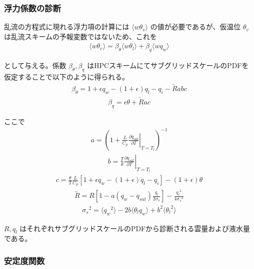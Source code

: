 \hypertarget{ux6d6eux529bux4fc2ux6570ux306eux8a3aux65ad}{%
\subsubsection{浮力係数の診断}\label{ux6d6eux529bux4fc2ux6570ux306eux8a3aux65ad}}

乱流の方程式に現れる浮力項の計算には \(\langle w\theta_v \rangle\)
の値が必要であるが、仮温位 \(\theta_v\)
は乱流スキームの予報変数ではないため、これを
\begin{eqnarray}\langle w\theta_v \rangle=\beta_\theta \langle w\theta_l \rangle + \beta_q \langle wq_w \rangle\end{eqnarray}

として与える。係数 \(\beta_\theta , \beta_q\)
はHPCスキームにてサブグリッドスケールのPDFを仮定することで以下のように得られる。
\begin{eqnarray}\beta_\theta=1+\epsilon q_w-(1+\epsilon)q_l-q_i-\tilde{R}abc\end{eqnarray}
\begin{eqnarray}\beta_q=\epsilon \theta +\tilde{R}ac\end{eqnarray}

ここで
\begin{eqnarray}a=\left(1+\frac{L}{C_p}\left.\frac{\partial q_{sat}}{\partial T}\right|_{T=T_l}\right)^{-1}\end{eqnarray}
\begin{eqnarray}b=\frac{T}{\theta}\left.\frac{\partial q_{sat}}{\partial T}\right|_{T=T_l}\end{eqnarray}
\begin{eqnarray}c=\frac{\theta}{T}\frac{L}{C_p}\left[1+\epsilon q_w-(1+\epsilon)q_l-q_i\right]-(1+\epsilon)\theta\end{eqnarray}
\begin{eqnarray}\tilde{R}=R\left[1-a(q_w-q_{sat})\frac{q_l}{2\sigma_s}\right]-\frac{{q_l}^2}{4{\sigma_s}^2}\end{eqnarray}
\begin{eqnarray}{\sigma_s}^2=\langle {q_w}^2 \rangle -2b \langle \theta_l q_w \rangle + b^2\langle {\theta_l}^2 \rangle\end{eqnarray}

\(R,q_l\)
はそれぞれサブグリッドスケールのPDFから診断される雲量および液水量である。

\hypertarget{ux5b89ux5b9aux5ea6ux95a2ux6570}{%
\subsubsection{安定度関数}\label{ux5b89ux5b9aux5ea6ux95a2ux6570}}

